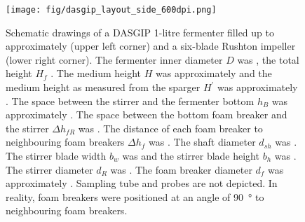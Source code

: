 \begin{figure}
	\begin{center}
		\texttt{[image: fig/dasgip\_layout\_side\_600dpi.png]}
		\caption[Setup of DASGIP Fermenter for Fungal Fermentation (Side)]{Schematic drawings of a DASGIP 1-litre fermenter filled up to approximately  (upper left corner) and a six-blade Rushton impeller (lower right corner). The fermenter inner diameter $D$ was , the total height $H_f$ . The medium height $H$ was approximately  and the medium height as measured from the sparger $H^\prime$ was approximately . The space between the stirrer and the fermenter bottom $h_B$ was approximately . The space between the bottom foam breaker and the stirrer $\Delta{}h_{fR}$ was . The distance of each foam breaker to neighbouring foam breakers $\Delta{}h_f$ was . The shaft diameter $d_{sh}$ was . The stirrer blade width $b_w$ was  and the stirrer blade height $b_h$ was . The stirrer diameter $d_R$ was . The foam breaker diameter $d_f$ was approximately . Sampling tube and probes are not depicted. In reality, foam breakers were positioned at an angle of \SI{90}{\degree} to neighbouring foam breakers.\label{fig-dasgip-side}}
	\end{center}
\end{figure}


